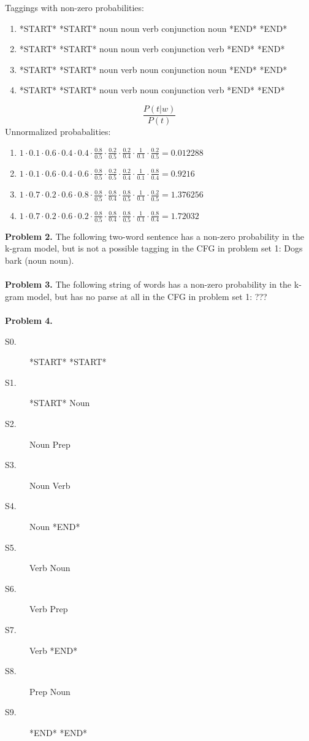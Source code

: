 \documentclass{article}
\begin{document}
Taggings with non-zero probabilities:
\begin{enumerate}
	\item *START* *START* noun noun verb conjunction noun *END* *END*
	\item *START* *START* noun noun verb conjunction verb *END* *END*
	\item *START* *START* noun verb noun conjunction noun *END* *END*
	\item *START* *START* noun verb noun conjunction verb *END* *END*
\end{enumerate}
$$\frac{P(t|w)}{P(t)}$$
Unnormalized probabalities:
\begin{enumerate}
	\item $1\cdot 0.1\cdot 0.6\cdot 0.4\cdot 0.4\cdot\frac{0.8}{0.5}\cdot\frac{0.2}{0.5}\cdot\frac{0.2}{0.4}\cdot\frac{1}{0.1}\cdot\frac{0.2}{0.5}=0.012288$
	\item $1\cdot 0.1\cdot 0.6\cdot 0.4\cdot 0.6\cdot\frac{0.8}{0.5}\cdot\frac{0.2}{0.5}\cdot\frac{0.2}{0.4}\cdot\frac{1}{0.1}\cdot\frac{0.8}{0.4}=0.9216$
	\item $1\cdot 0.7\cdot 0.2\cdot 0.6\cdot 0.8\cdot\frac{0.8}{0.5}\cdot\frac{0.8}{0.4}\cdot\frac{0.8}{0.5}\cdot\frac{1}{0.1}\cdot\frac{0.2}{0.5}=1.376256$
	\item $1\cdot 0.7\cdot 0.2\cdot 0.6\cdot 0.2\cdot\frac{0.8}{0.5}\cdot\frac{0.8}{0.4}\cdot\frac{0.8}{0.5}\cdot\frac{1}{0.1}\cdot\frac{0.8}{0.4}=1.72032$
\end{enumerate}
\textbf{Problem 2.} The following two-word sentence has a non-zero probability in the k-gram model, but is not a possible tagging in the CFG in problem set 1: Dogs bark (noun noun).\\
\\
\textbf{Problem 3.} The following string of words has a non-zero probability in the k-gram model, but has no parse at all in the CFG in problem set 1: ???\\
\\
\textbf{Problem 4.}
\begin{description}
	\item [S0.] *START* *START*
	\item [S1.] *START* Noun
	\item [S2.] Noun Prep
	\item [S3.] Noun Verb
	\item [S4.] Noun *END*
	\item [S5.] Verb Noun
	\item [S6.] Verb Prep
	\item [S7.] Verb *END*
	\item [S8.] Prep Noun
	\item [S9.] *END* *END*
\end{description}
\end{document}
